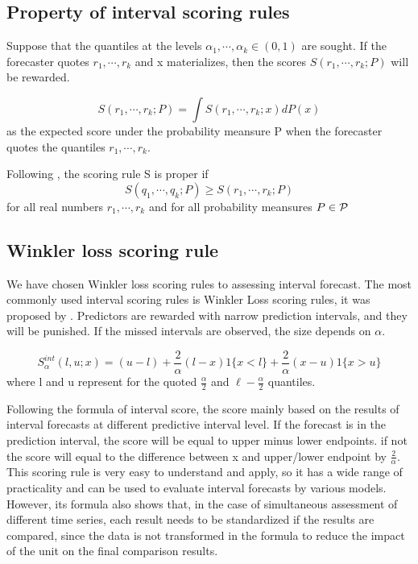 \documentclass{monashthesis}
\theoremstyle{definition}
\theoremstyle{definition}
\theoremstyle{definition}
\theoremstyle{remark}
\begin{document}
\subsection{Property of interval scoring
rules}\label{property-of-interval-scoring-rules}

Suppose that the quantiles at the levels
\(\alpha_1,\cdots,\alpha_k\in(0,1)\) are sought. If the forecaster
quotes \(r_1,\cdots,r_k\) and x materializes, then the scores
\(S(r_1,\cdots,r_k;P)\) will be rewarded.

\[S(r_1,\cdots,r_k;P)=\int{S(r_1,\cdots,r_k;x)dP(x)}\] as the expected
score under the probability meansure P when the forecaster quotes the
quantiles \(r_1,\cdots,r_k\).

Following \textcite{CM96}, the scoring rule S is proper if
\[S(q_1,\cdots,q_k;P)\geq S(r_1,\cdots,r_k;P)\] for all real numbers
\(r_1,\cdots,r_k\) and for all probability meansures \(P\in\cal{P}\)

\subsection{Winkler loss scoring rule}\label{winkler-loss-scoring-rule}

We have chosen Winkler loss scoring rules to assessing interval
forecast. The most commonly used interval scoring rules is Winkler Loss
scoring rules, it was proposed by \textcite{W72}. Predictors are
rewarded with narrow prediction intervals, and they will be punished. If
the missed intervals are observed, the size depends on \(\alpha\).

\[
  S_\alpha^{int}(l,u;x)=(u-l)+\frac{2}{\alpha}(l-x)1\{x<l\}+\frac{2}{\alpha}(x-u)1\{x>u\}
\] where l and u represent for the quoted \(\frac{\alpha}{2}\) and
\(\ell-\frac{\alpha}{2}\) quantiles.

Following the formula of interval score, the score mainly based on the
results of interval forecasts at different predictive interval level. If
the forecast is in the prediction interval, the score will be equal to
upper minus lower endpoints. if not the score will equal to the
difference between x and upper/lower endpoint by \(\frac{2}{\alpha}\).
This scoring rule is very easy to understand and apply, so it has a wide
range of practicality and can be used to evaluate interval forecasts by
various models. However, its formula also shows that, in the case of
simultaneous assessment of different time series, each result needs to
be standardized if the results are compared, since the data is not
transformed in the formula to reduce the impact of the unit on the final
comparison results.
\end{document}
